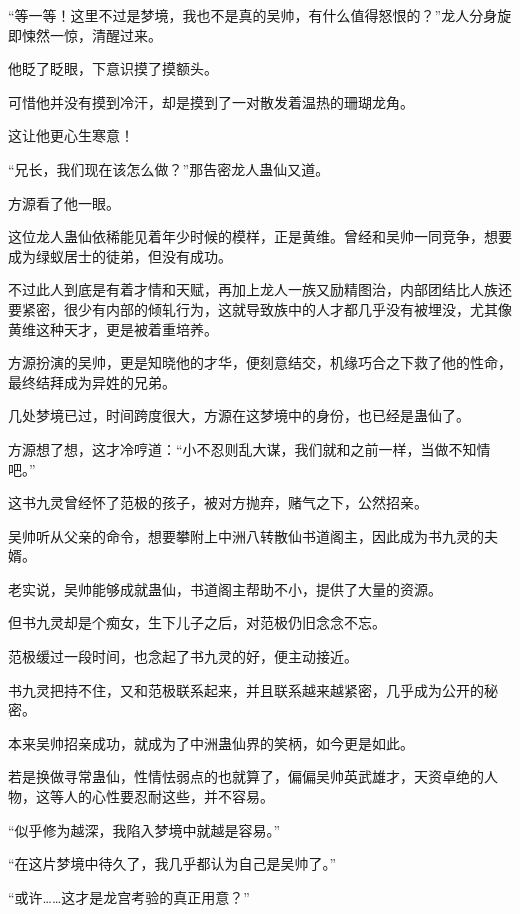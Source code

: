 
\begin{this_body}



“等一等！这里不过是梦境，我也不是真的吴帅，有什么值得怒恨的？”龙人分身旋即悚然一惊，清醒过来。

他眨了眨眼，下意识摸了摸额头。

可惜他并没有摸到冷汗，却是摸到了一对散发着温热的珊瑚龙角。

这让他更心生寒意！

“兄长，我们现在该怎么做？”那告密龙人蛊仙又道。

方源看了他一眼。

这位龙人蛊仙依稀能见着年少时候的模样，正是黄维。曾经和吴帅一同竞争，想要成为绿蚁居士的徒弟，但没有成功。

不过此人到底是有着才情和天赋，再加上龙人一族又励精图治，内部团结比人族还要紧密，很少有内部的倾轧行为，这就导致族中的人才都几乎没有被埋没，尤其像黄维这种天才，更是被着重培养。

方源扮演的吴帅，更是知晓他的才华，便刻意结交，机缘巧合之下救了他的性命，最终结拜成为异姓的兄弟。

几处梦境已过，时间跨度很大，方源在这梦境中的身份，也已经是蛊仙了。

方源想了想，这才冷哼道：“小不忍则乱大谋，我们就和之前一样，当做不知情吧。”

这书九灵曾经怀了范极的孩子，被对方抛弃，赌气之下，公然招亲。

吴帅听从父亲的命令，想要攀附上中洲八转散仙书道阁主，因此成为书九灵的夫婿。

老实说，吴帅能够成就蛊仙，书道阁主帮助不小，提供了大量的资源。

但书九灵却是个痴女，生下儿子之后，对范极仍旧念念不忘。

范极缓过一段时间，也念起了书九灵的好，便主动接近。

书九灵把持不住，又和范极联系起来，并且联系越来越紧密，几乎成为公开的秘密。

本来吴帅招亲成功，就成为了中洲蛊仙界的笑柄，如今更是如此。

若是换做寻常蛊仙，性情怯弱点的也就算了，偏偏吴帅英武雄才，天资卓绝的人物，这等人的心性要忍耐这些，并不容易。

“似乎修为越深，我陷入梦境中就越是容易。”

“在这片梦境中待久了，我几乎都认为自己是吴帅了。”

“或许……这才是龙宫考验的真正用意？”


\end{this_body}
